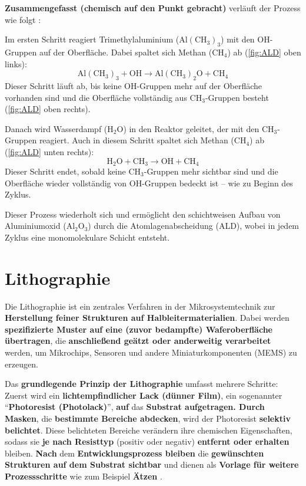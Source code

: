 \documentclass{article} %
\begin{document}
\textbf{Zusammengefasst (chemisch auf den Punkt gebracht)} verläuft der Prozess wie folgt \cite{keplinger2024CVD}:

Im ersten Schritt reagiert Trimethylaluminium (\(\mathrm{Al(CH_3)_3}\)) mit den OH-Gruppen auf der Oberfläche. Dabei spaltet sich Methan ($\mathrm{CH_4}$) ab (\autoref{fig:ALD} oben links):
$$
\mathrm{Al(CH_3)_3} + \mathrm{OH} \rightarrow \mathrm{Al(CH_3)_2O} + \mathrm{CH_4}
$$
Dieser Schritt läuft ab, bis keine OH-Gruppen mehr auf der Oberfläche vorhanden sind und die Oberfläche vollständig aus \(\mathrm{CH_3}\)-Gruppen besteht (\autoref{fig:ALD} oben rechts).

Danach wird Wasserdampf (\(\mathrm{H_2O}\)) in den Reaktor geleitet, der mit den \(\mathrm{CH_3}\)-Gruppen reagiert. Auch in diesem Schritt spaltet sich Methan ($\mathrm{CH_4}$) ab (\autoref{fig:ALD} unten rechts):
$$
\mathrm{H_2O} + \mathrm{CH_3} \rightarrow \mathrm{OH} + \mathrm{CH_4}
$$
Dieser Schritt endet, sobald keine \(\mathrm{CH_3}\)-Gruppen mehr sichtbar sind und die Oberfläche wieder vollständig von \(\mathrm{OH}\)-Gruppen bedeckt ist -- wie zu Beginn des Zyklus.

Dieser Prozess wiederholt sich und ermöglicht den schichtweisen Aufbau von Aluminiumoxid (\(\mathrm{Al_2O_3}\)) durch die Atomlagenabscheidung (ALD), wobei in jedem Zyklus eine monomolekulare Schicht entsteht.





\clearpage
\section{Lithographie}

Die Lithographie ist ein zentrales Verfahren in der Mikrosystemtechnik zur \textbf{Herstellung feiner Strukturen auf Halbleitermaterialien}. Dabei werden \textbf{spezifizierte Muster auf eine (zuvor bedampfte) Waferoberfläche übertragen}, die \textbf{anschließend geätzt oder anderweitig verarbeitet} werden, um Mikrochips, Sensoren und andere Miniaturkomponenten (MEMS) zu erzeugen.

\vspace{1em}

Das \textbf{grundlegende Prinzip der Lithographie} umfasst mehrere Schritte: Zuerst wird ein \textbf{lichtempfindlicher Lack (dünner Film)}, ein sogenannter ``\textbf{Photoresist (Photolack)}'', \textbf{auf} das \textbf{Substrat aufgetragen. Durch Masken}, die \textbf{bestimmte Bereiche abdecken}, wird der Photoresist \textbf{selektiv belichtet}. Diese belichteten Bereiche verändern ihre chemischen Eigenschaften, sodass sie \textbf{je nach Resisttyp} (positiv oder negativ) \textbf{entfernt oder erhalten} bleiben. \textbf{Nach} dem \textbf{Entwicklungsprozess bleiben} die \textbf{gewünschten Strukturen auf dem Substrat sichtbar} und dienen als \textbf{Vorlage für weitere Prozessschritte} wie zum Beispiel \textbf{Ätzen} \cite{madou2002}.
\end{document}
